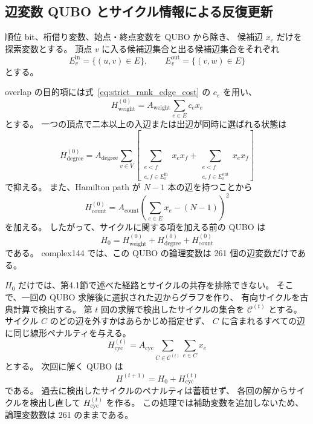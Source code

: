 \documentclass[a4j,10pt]{ujarticle}
\begin{document}
\subsection{辺変数 QUBO とサイクル情報による反復更新}

順位 bit、桁借り変数、始点・終点変数を QUBO から除き、
候補辺 $x_e$ だけを探索変数とする。
頂点 $v$ に入る候補辺集合と出る候補辺集合をそれぞれ
\begin{equation}
E_v^{\mathrm{in}}
=
\{(u,v)\in E\},
\qquad
E_v^{\mathrm{out}}
=
\{(v,w)\in E\}
\label{eq:edge_only_incident_sets}
\end{equation}
とする。

overlap の目的項には式~\eqref{eq:strict_rank_edge_cost} の $c_e$ を用い、
\begin{equation}
H_{\mathrm{weight}}^{(0)}
=
A_{\mathrm{weight}}
\sum_{e\in E}c_ex_e
\label{eq:edge_only_weight_hamiltonian}
\end{equation}
とする。
一つの頂点で二本以上の入辺または出辺が同時に選ばれる状態は
\begin{equation}
H_{\mathrm{degree}}^{(0)}
=
A_{\mathrm{degree}}
\sum_{v\in V}
\left[
\sum_{\substack{e<f\\ e,f\in E_v^{\mathrm{in}}}}x_ex_f
+
\sum_{\substack{e<f\\ e,f\in E_v^{\mathrm{out}}}}x_ex_f
\right]
\label{eq:edge_only_degree_hamiltonian}
\end{equation}
で抑える。
また、Hamilton path が $N-1$ 本の辺を持つことから
\begin{equation}
H_{\mathrm{count}}^{(0)}
=
A_{\mathrm{count}}
\left(
\sum_{e\in E}x_e-(N-1)
\right)^2
\label{eq:edge_only_count_hamiltonian}
\end{equation}
を加える。
したがって、サイクルに関する項を加える前の QUBO は
\begin{equation}
H_0
=
H_{\mathrm{weight}}^{(0)}
+
H_{\mathrm{degree}}^{(0)}
+
H_{\mathrm{count}}^{(0)}
\label{eq:edge_only_base_hamiltonian}
\end{equation}
である。
complex144 では、この QUBO の論理変数は 261 個の辺変数だけである。

$H_0$ だけでは、第4.1節で述べた経路とサイクルの共存を排除できない。
そこで、一回の QUBO 求解後に選択された辺からグラフを作り、
有向サイクルを古典計算で検出する。
第 $t$ 回の求解で検出したサイクルの集合を $\mathcal{C}^{(t)}$ とする。
サイクル $C$ のどの辺を外すかはあらかじめ指定せず、
$C$ に含まれるすべての辺に同じ線形ペナルティを与える。
\begin{equation}
H_{\mathrm{cyc}}^{(t)}
=
A_{\mathrm{cyc}}
\sum_{C\in\mathcal{C}^{(t)}}
\sum_{e\in C}x_e
\label{eq:uniform_cycle_penalty}
\end{equation}
とする。
次回に解く QUBO は
\begin{equation}
H^{(t+1)}
=
H_0+H_{\mathrm{cyc}}^{(t)}
\label{eq:iterative_cycle_hamiltonian}
\end{equation}
である。
過去に検出したサイクルのペナルティは蓄積せず、
各回の解からサイクルを検出し直して $H_{\mathrm{cyc}}^{(t)}$ を作る。
この処理では補助変数を追加しないため、論理変数数は 261 のままである。
\end{document}
